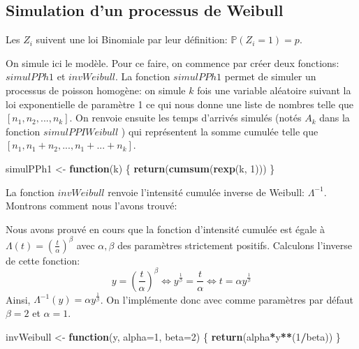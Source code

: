 \documentclass[
]{article}
\newenvironment{Shaded}{\begin{snugshade}}{\end{snugshade}}
\newcommand{\AttributeTok}[1]{\textcolor[rgb]{0.13,0.29,0.53}{#1}}
\newcommand{\ControlFlowTok}[1]{\textcolor[rgb]{0.13,0.29,0.53}{\textbf{#1}}}
\newcommand{\DecValTok}[1]{\textcolor[rgb]{0.00,0.00,0.81}{#1}}
\newcommand{\FunctionTok}[1]{\textcolor[rgb]{0.13,0.29,0.53}{\textbf{#1}}}
\newcommand{\NormalTok}[1]{#1}
\newcommand{\OtherTok}[1]{\textcolor[rgb]{0.56,0.35,0.01}{#1}}
\newcommand{\SpecialCharTok}[1]{\textcolor[rgb]{0.81,0.36,0.00}{\textbf{#1}}}
\begin{document}
\subsection{Simulation d'un processus de
Weibull}\label{simulation-dun-processus-de-weibull}

Les \(Z_i\) suivent une loi Binomiale par leur définition:
\(\mathbb{P}(Z_i=1)=p\).

On simule ici le modèle. Pour ce faire, on commence par créer deux
fonctions: \(simulPPh1\) et \(invWeibull\). La fonction \(simulPPh1\)
permet de simuler un processus de poisson homogène: on simule \(k\) fois
une variable aléatoire suivant la loi exponentielle de paramètre 1 ce
qui nous donne une liste de nombres telle que \([n_1 , n_2,...,n_k]\).
On renvoie ensuite les temps d'arrivés simulés (notés \(A_k\) dans la
fonction \(simulPPIWeibull\) ) qui représentent la somme cumulée telle
que \([n_1, n_1+n_2,... , n_1+...+n_k]\).

\begin{Shaded}
\begin{Highlighting}[]
\NormalTok{simulPPh1 }\OtherTok{\textless{}{-}} \ControlFlowTok{function}\NormalTok{(k)}
\NormalTok{\{}
  \FunctionTok{return}\NormalTok{(}\FunctionTok{cumsum}\NormalTok{(}\FunctionTok{rexp}\NormalTok{(k, }\DecValTok{1}\NormalTok{)))}
\NormalTok{\}}
\end{Highlighting}
\end{Shaded}

La fonction \(invWeibull\) renvoie l'intensité cumulée inverse de
Weibull: \(\Lambda^{-1}\). Montrons comment nous l'avons trouvé:

Nous avons prouvé en cours que la fonction d'intensité cumulée est égale
à \(\Lambda(t)=(\frac{t}{\alpha})^{\beta}\) avec \(\alpha , \beta\) des
paramètres strictement positifs. Calculons l'inverse de cette fonction:
\[
y=(\frac{t}{\alpha})^{\beta}
\iff
y^{\frac{1}{\beta}} = \frac{t}{\alpha}
\iff
t=\alpha y^{\frac{1}{\beta}}
\] Ainsi, \(\Lambda^{-1}(y)=\alpha y^{\frac{1}{\beta}}\). On
l'implémente donc avec comme paramètres par défaut \(\beta=2\) et
\(\alpha=1\).

\begin{Shaded}
\begin{Highlighting}[]
\NormalTok{invWeibull }\OtherTok{\textless{}{-}} \ControlFlowTok{function}\NormalTok{(y, }\AttributeTok{alpha=}\DecValTok{1}\NormalTok{, }\AttributeTok{beta=}\DecValTok{2}\NormalTok{)}
\NormalTok{\{}
  \FunctionTok{return}\NormalTok{(alpha}\SpecialCharTok{*}\NormalTok{y}\SpecialCharTok{**}\NormalTok{(}\DecValTok{1}\SpecialCharTok{/}\NormalTok{beta))}
\NormalTok{\}}
\end{Highlighting}
\end{Shaded}
\end{document}
